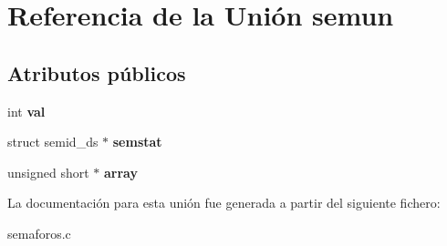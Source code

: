 \hypertarget{unionsemun}{}\section{Referencia de la Unión semun}
\label{unionsemun}
\subsection*{Atributos públicos}
\begin{DoxyCompactItemize}
\item 
\mbox{\label{unionsemun_ac6121ecb6d04a024e07e12bd71b94031}} 
int {\bfseries val}
\item 
\mbox{\label{unionsemun_afb976847aea44952be2118ad0329d832}} 
struct semid\+\_\+ds $\ast$ {\bfseries semstat}
\item 
\mbox{\label{unionsemun_aca23b8e730a0553205813c0cb7692b54}} 
unsigned short $\ast$ {\bfseries array}
\end{DoxyCompactItemize}


La documentación para esta unión fue generada a partir del siguiente fichero\+:\begin{DoxyCompactItemize}
\item 
semaforos.\+c\end{DoxyCompactItemize}
